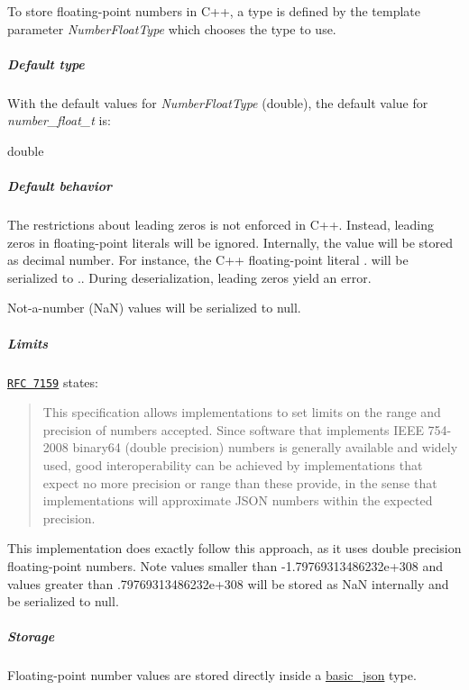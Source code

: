 To store floating-\/point numbers in C++, a type is defined by the template parameter {\itshape Number\-Float\-Type} which chooses the type to use.

\subparagraph*{Default type}

With the default values for {\itshape Number\-Float\-Type} ({\ttfamily double}), the default value for {\itshape number\-\_\-float\-\_\-t} is\-:


\begin{DoxyCode}
\textcolor{keywordtype}{double}
\end{DoxyCode}


\subparagraph*{Default behavior}


\begin{DoxyItemize}
\item The restrictions about leading zeros is not enforced in C++. Instead, leading zeros in floating-\/point literals will be ignored. Internally, the value will be stored as decimal number. For instance, the C++ floating-\/point literal {.} will be serialized to {.}. During deserialization, leading zeros yield an error.
\item Not-\/a-\/number (Na\-N) values will be serialized to {\ttfamily null}.
\end{DoxyItemize}

\subparagraph*{Limits}

\href{http://rfc7159.net/rfc7159}{\tt R\-F\-C 7159} states\-: \begin{quotation}
This specification allows implementations to set limits on the range and precision of numbers accepted. Since software that implements I\-E\-E\-E 754-\/2008 binary64 (double precision) numbers is generally available and widely used, good interoperability can be achieved by implementations that expect no more precision or range than these provide, in the sense that implementations will approximate J\-S\-O\-N numbers within the expected precision.

\end{quotation}


This implementation does exactly follow this approach, as it uses double precision floating-\/point numbers. Note values smaller than {\ttfamily -\/1.\-79769313486232e+308} and values greater than {.\-79769313486232e+308} will be stored as Na\-N internally and be serialized to {\ttfamily null}.

\subparagraph*{Storage}

Floating-\/point number values are stored directly inside a \hyperlink{classnlohmann_1_1basic__json}{basic\-\_\-json} type.

